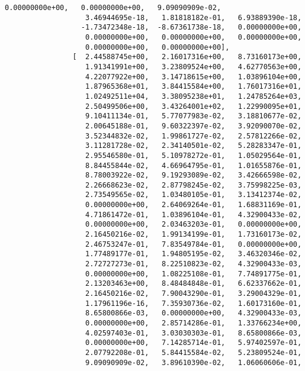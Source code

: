 \documentclass[11pt]{article}
\begin{document}
\begin{Verbatim}[commandchars=\\\{\}]
                   0.00000000e+00,   0.00000000e+00,   9.09090909e-02,
                   3.46944695e-18,   1.81818182e-01,   6.93889390e-18,
                  -1.73472348e-18,  -8.67361738e-18,   0.00000000e+00,
                   0.00000000e+00,   0.00000000e+00,   0.00000000e+00,
                   0.00000000e+00,   0.00000000e+00],
                [  2.44588745e+00,   2.16017316e+00,   8.73160173e+00,
                   1.91341991e+00,   3.23809524e+00,   4.62770563e+00,
                   4.22077922e+00,   3.14718615e+00,   1.03896104e+00,
                   1.87965368e+01,   3.84415584e+00,   1.76017316e+01,
                   1.02492511e+04,   3.38095238e+01,   1.24785264e+03,
                   2.50499506e+00,   3.43264001e+02,   1.22990095e+01,
                   9.10411134e-01,   5.77077983e-02,   3.18810677e-02,
                   2.00645188e-01,   9.60322397e-02,   3.92090070e-02,
                   3.52344832e-02,   1.99861727e-02,   2.57812266e-02,
                   3.11281728e-02,   2.34140501e-02,   5.28283347e-01,
                   2.95546580e-01,   5.10978272e-01,   1.05029564e-01,
                   8.84455844e-02,   4.66964795e-01,   1.01655876e-01,
                   8.78003922e-02,   9.19293089e-02,   3.42666598e-02,
                   2.26668623e-02,   2.87798245e-02,   3.75998225e-03,
                   2.73549565e-02,   1.03480105e-01,   3.13412374e-02,
                   0.00000000e+00,   2.64069264e-01,   1.68831169e-01,
                   4.71861472e-01,   1.03896104e-01,   4.32900433e-02,
                   0.00000000e+00,   2.03463203e-01,   0.00000000e+00,
                   2.16450216e-02,   1.99134199e-01,   1.73160173e-02,
                   2.46753247e-01,   7.83549784e-01,   0.00000000e+00,
                   1.77489177e-01,   1.94805195e-02,   3.46320346e-02,
                   2.72727273e-01,   8.22510823e-02,   4.32900433e-03,
                   0.00000000e+00,   1.08225108e-01,   7.74891775e-01,
                   2.13203463e+00,   8.48484848e-01,   6.62337662e-01,
                   2.16450216e-02,   7.90043290e-01,   3.29004329e-01,
                   1.17961196e-16,   7.35930736e-02,   1.60173160e-01,
                   8.65800866e-03,   0.00000000e+00,   4.32900433e-03,
                   0.00000000e+00,   2.85714286e-01,   1.33766234e+00,
                   4.02597403e-01,   3.03030303e-01,   8.65800866e-03,
                   0.00000000e+00,   7.14285714e-01,   5.97402597e-01,
                   2.07792208e-01,   5.84415584e-02,   5.23809524e-01,
                   9.09090909e-02,   3.89610390e-02,   1.06060606e-01,

\end{Verbatim}
\end{document}
